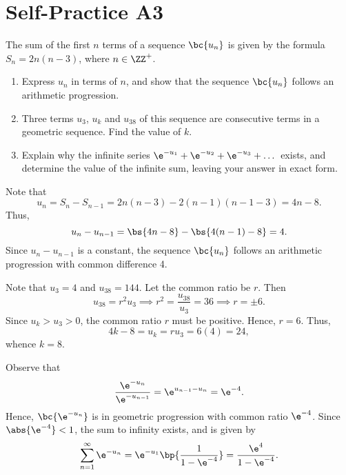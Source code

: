 \section{Self-Practice A3}

\begin{problem}
    The sum of the first $n$ terms of a sequence $\bc{u_n}$ is given by the formula $S_n = 2n(n-3)$, where $n \in \ZZ^+$.

    \begin{enumerate}
        \item Express $u_n$ in terms of $n$, and show that the sequence $\bc{u_n}$ follows an arithmetic progression.
        \item Three terms $u_3$, $u_k$ and $u_{38}$ of this sequence are consecutive terms in a geometric sequence. Find the value of $k$.
        \item Explain why the infinite series $\e^{-u_1} + \e^{-u_2} + \e^{-u_3} + \dots$ exists, and determine the value of the infinite sum, leaving your answer in exact form.
    \end{enumerate}
\end{problem}
\begin{solution}
    \begin{ppart}
        Note that \[u_n = S_n - S_{n-1} = 2n(n-3) - 2(n-1)(n-1-3) = 4n-8.\] Thus, \[u_n - u_{n-1} = \bs{4n - 8} - \bs{4(n-1) - 8} = 4.\] Since $u_n - u_{n-1}$ is a constant, the sequence $\bc{u_n}$ follows an arithmetic progression with common difference 4.
    \end{ppart}
    \begin{ppart}
        Note that $u_3 = 4$ and $u_{38} = 144$. Let the common ratio be $r$. Then \[u_{38} = r^2 u_3 \implies r^2 = \frac{u_{38}}{u_3} = 36 \implies r = \pm 6.\] Since $u_k > u_3 > 0$, the common ratio $r$ must be positive. Hence, $r = 6$. Thus, \[4k - 8 = u_k = ru_3 = 6(4) = 24,\] whence $k = 8$.
    \end{ppart}
    \begin{ppart}
        Observe that \[\frac{\e^{-u_n}}{\e^{-u_{n-1}}} = \e^{u_{n-1} - u_n} = \e^{-4}.\] Hence, $\bc{\e^{-u_n}}$ is in geometric progression with common ratio $\e^{-4}$. Since $\abs{\e^{-4}} < 1$, the sum to infinity exists, and is given by \[\sum_{n = 1}^\infty \e^{-u_n} = \e^{-u_1} \bp{\frac{1}{1 - \e^{-4}}} = \frac{\e^4}{1 - \e^{-4}}.\]
    \end{ppart}
\end{solution}

